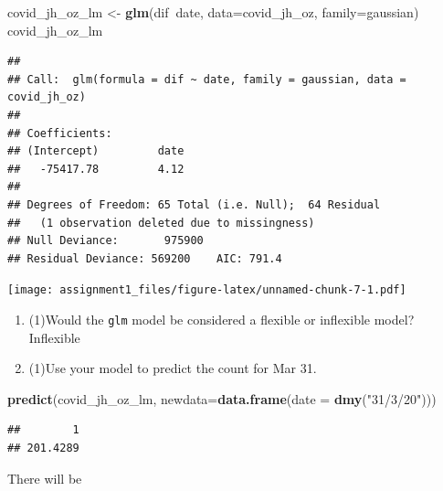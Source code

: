 \documentclass[
]{article}
\newenvironment{Shaded}{\begin{snugshade}}{\end{snugshade}}
\newcommand{\CommentTok}[1]{\textcolor[rgb]{0.56,0.35,0.01}{\textit{#1}}}
\newcommand{\DataTypeTok}[1]{\textcolor[rgb]{0.13,0.29,0.53}{#1}}
\newcommand{\KeywordTok}[1]{\textcolor[rgb]{0.13,0.29,0.53}{\textbf{#1}}}
\newcommand{\NormalTok}[1]{#1}
\newcommand{\OperatorTok}[1]{\textcolor[rgb]{0.81,0.36,0.00}{\textbf{#1}}}
\newcommand{\OtherTok}[1]{\textcolor[rgb]{0.56,0.35,0.01}{#1}}
\newcommand{\StringTok}[1]{\textcolor[rgb]{0.31,0.60,0.02}{#1}}
\providecommand{\tightlist}{%
  \setlength{\itemsep}{0pt}\setlength{\parskip}{0pt}}
\begin{document}
\begin{Shaded}
\begin{Highlighting}[]
\NormalTok{covid_jh_oz_lm <-}\StringTok{ }\KeywordTok{glm}\NormalTok{(dif}\OperatorTok{~}\NormalTok{date, }\DataTypeTok{data=}\NormalTok{covid_jh_oz, }\DataTypeTok{family=}\NormalTok{gaussian)}
\NormalTok{covid_jh_oz_lm}
\end{Highlighting}
\end{Shaded}

\begin{verbatim}
## 
## Call:  glm(formula = dif ~ date, family = gaussian, data = covid_jh_oz)
## 
## Coefficients:
## (Intercept)         date  
##   -75417.78         4.12  
## 
## Degrees of Freedom: 65 Total (i.e. Null);  64 Residual
##   (1 observation deleted due to missingness)
## Null Deviance:       975900 
## Residual Deviance: 569200    AIC: 791.4
\end{verbatim}

\begin{Shaded}
\end{Shaded}

\texttt{[image: assignment1\_files/figure-latex/unnamed-chunk-7-1.pdf]}

\begin{enumerate}
\def\labelenumi{\alph{enumi}.}
\setcounter{enumi}{3}
\tightlist
\item
  (1)Would the \texttt{glm} model be considered a flexible or inflexible
  model? Inflexible
\item
  (1)Use your model to predict the count for Mar 31.
\end{enumerate}

\begin{Shaded}
\begin{Highlighting}[]
\KeywordTok{predict}\NormalTok{(covid_jh_oz_lm, }\DataTypeTok{newdata=}\KeywordTok{data.frame}\NormalTok{(}\DataTypeTok{date =} \KeywordTok{dmy}\NormalTok{(}\StringTok{"31/3/20"}\NormalTok{)))}
\end{Highlighting}
\end{Shaded}

\begin{verbatim}
##        1 
## 201.4289
\end{verbatim}

There will be
\end{document}
